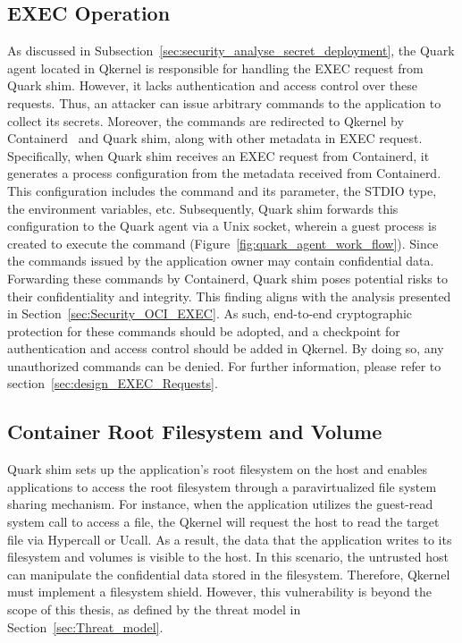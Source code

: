 \subsection{EXEC Operation}
As discussed in Subsection~\ref{sec:security_analyse_secret_deployment}, the Quark agent located in Qkernel is responsible for handling the EXEC request from Quark shim. However, it lacks authentication and access control over these requests. Thus, an attacker can issue arbitrary commands to the application to collect its secrets. Moreover, the commands are 
redirected to Qkernel by Containerd~\cite*{containerd} and Quark shim, along with other metadata in EXEC request. Specifically, when Quark shim receives an EXEC request from Containerd, it generates a process configuration from the metadata received from Containerd. This configuration includes the command and its parameter, the STDIO type, the environment 
variables, etc. Subsequently, Quark shim forwards this configuration to the Quark agent via a Unix socket, wherein a guest process is created to execute the command (Figure~\ref{fig:quark_agent_work_flow}). Since the commands issued by the application owner may contain confidential data. Forwarding these commands by Containerd, Quark shim poses potential risks 
to their confidentiality and integrity. This finding aligns with the analysis presented in Section~\ref{sec:Security_OCI_EXEC}. As such, end-to-end cryptographic protection for these commands should be adopted, and a checkpoint for authentication and access control should be added in Qkernel. By doing so, any unauthorized commands can be denied. For further information, 
please refer to section~\ref{sec:design_EXEC_Requests}.


\subsection{Container Root Filesystem and Volume}
Quark shim sets up the application's root filesystem on the host and enables applications to access the root filesystem through a paravirtualized file system sharing mechanism. For instance, when the application utilizes the guest-read system call to access a file, the Qkernel will request the host to read the target file via Hypercall or Ucall. As a result, the 
data that the application writes to its filesystem and volumes is visible to the host. In this scenario, the untrusted host can manipulate the confidential data stored in the filesystem. Therefore, Qkernel must implement a filesystem shield. However, this vulnerability is beyond the scope of this thesis, as defined by the threat model in 
Section~\ref{sec:Threat_model}.

